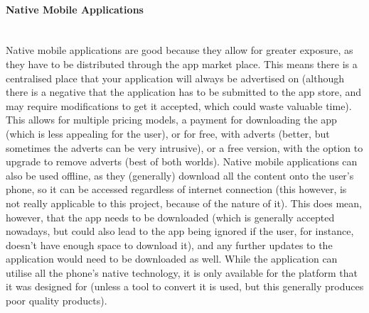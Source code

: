 \documentclass[a4paper,twoside,notitlepage,11pt]{article}
\begin{document}
\paragraph{Native Mobile Applications}\ \\
Native mobile applications are good because they allow for greater exposure, as they have to be distributed through the app market place. This means there is a centralised place that your application will always be advertised on (although there is a negative that the application has to be submitted to the app store, and may require modifications to get it accepted, which could waste valuable time). This allows for multiple pricing models, a payment for downloading the app (which is less appealing for the user), or for free, with adverts (better, but sometimes the adverts can be very intrusive), or a free version, with the option to upgrade to remove adverts (best of both worlds). Native mobile applications can also be used offline, as they (generally) download all the content onto the user's phone, so it can be accessed regardless of internet connection (this however, is not really applicable to this project, because of the nature of it). This does mean, however, that the app needs to be downloaded (which is generally accepted nowadays, but could also lead to the app being ignored if the user, for instance, doesn't have enough space to download it), and any further updates to the application would need to be downloaded as well. While the application can utilise all the phone's native technology, it is only available for the platform that it was designed for (unless a tool to convert it is used, but this generally produces poor quality products). 
 
 
\end{document}

